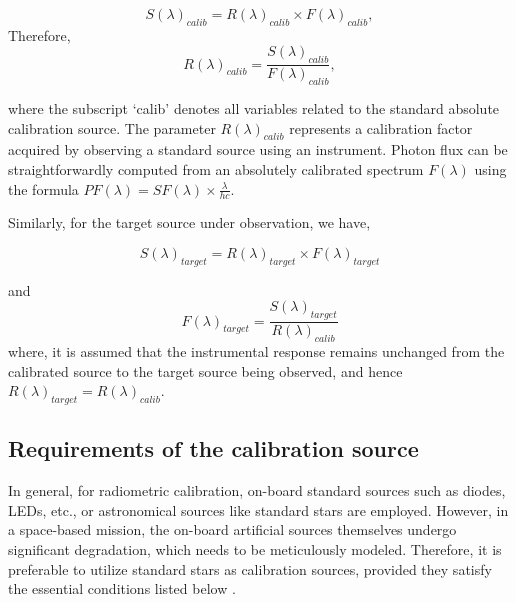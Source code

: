 \begin{equation*}
    S(\lambda)_{calib} = R(\lambda)_{calib} \times F(\lambda)_{calib},
\end{equation*}
\noindent Therefore,
\begin{equation*}
    R(\lambda)_{calib} = \frac{S(\lambda)_{calib}}{F(\lambda)_{calib}},
\end{equation*}

\noindent where the subscript `calib' denotes all variables related to the standard absolute calibration source. The parameter $R(\lambda)_{calib}$ represents a calibration factor acquired by observing a standard source using an instrument. Photon flux can be straightforwardly computed from an absolutely calibrated spectrum $F(\lambda)$ using the formula $PF(\lambda) = SF(\lambda) \times \frac{\lambda}{hc}$.

Similarly, for the target source under observation, we have,

\begin{equation*}
    S(\lambda)_{target} = R(\lambda)_{target} \times F(\lambda)_{target}
\end{equation*}

\noindent and 
\begin{equation}
    F(\lambda)_{target} = \frac{S(\lambda)_{target}}{R(\lambda)_{calib}}
\end{equation}
where, it is assumed that the instrumental response remains unchanged from the calibrated source to the target source being observed, and hence $R(\lambda)_{target}=R(\lambda)_{calib}$.

\subsection{Requirements of the calibration source} \label{req}

In general, for radiometric calibration, on-board standard sources such as diodes, LEDs, etc., or astronomical sources like standard stars are employed. However, in a space-based mission, the on-board artificial sources themselves undergo significant degradation, which needs to be meticulously modeled. Therefore, it is preferable to utilize standard stars as calibration sources, provided they satisfy the essential conditions listed below \citep{article2}.

